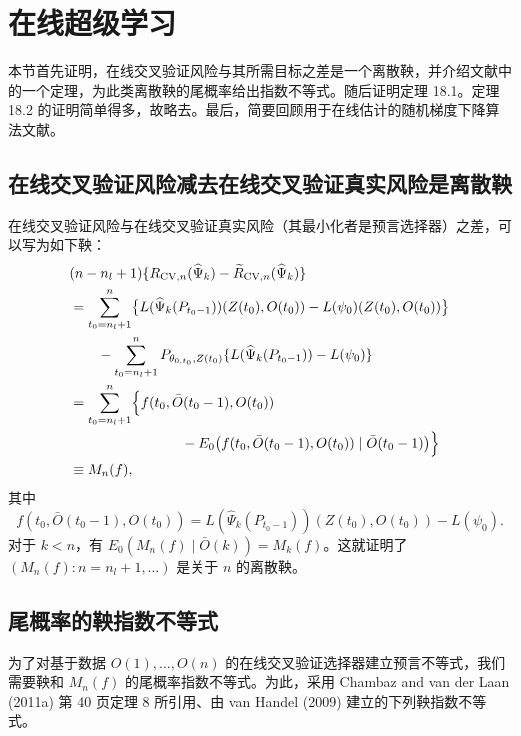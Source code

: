 
\section{在线超级学习}

本节首先证明，在线交叉验证风险与其所需目标之差是一个离散鞅，并介绍文献中的一个定理，为此类离散鞅的尾概率给出指数不等式。随后证明定理 18.1。定理 18.2 的证明简单得多，故略去。最后，简要回顾用于在线估计的随机梯度下降算法文献。

\subsection{在线交叉验证风险减去在线交叉验证真实风险是离散鞅}

在线交叉验证风险与在线交叉验证真实风险（其最小化者是预言选择器）之差，可以写为如下鞅：
\[
\begin{aligned}
&(n-n_l+1)\{R_{\mathrm{CV},n}(\widehat\Psi_k)
 -\widetilde R_{\mathrm{CV},n}(\widehat\Psi_k)\}\\
&=\sum_{t_0=n_l+1}^n\bigl\{
 L(\widehat\Psi_k(P_{t_0-1}))(Z(t_0),O(t_0))
 -L(\psi_0)(Z(t_0),O(t_0))\bigr\}\\
&\qquad-\sum_{t_0=n_l+1}^nP_{\theta_{0,t_0},Z(t_0)}
 \{L(\widehat\Psi_k(P_{t_0-1}))-L(\psi_0)\}\\
&=\sum_{t_0=n_l+1}^n\Bigl\{
 f(t_0,\bar O(t_0-1),O(t_0))\\
&\hspace{8em}-E_0\bigl(f(t_0,\bar O(t_0-1),O(t_0))\mid\bar O(t_0-1)\bigr)\Bigr\}\\
&\equiv M_n(f),
\end{aligned}
\]
其中
\[
f(t_0,\bar O(t_0-1),O(t_0))
 =L(\widehat\Psi_k(P_{t_0-1}))(Z(t_0),O(t_0))-L(\psi_0).
\]
对于 $k<n$，有 $E_0(M_n(f)\mid\bar O(k))=M_k(f)$。这就证明了 $(M_n(f):n=n_l+1,\ldots)$ 是关于 $n$ 的离散鞅。

\subsection{尾概率的鞅指数不等式}

为了对基于数据 $O(1),\ldots,O(n)$ 的在线交叉验证选择器建立预言不等式，我们需要鞅和 $M_n(f)$ 的尾概率指数不等式。为此，采用 Chambaz and van der Laan (2011a) 第 40 页定理 8 所引用、由 van Handel (2009) 建立的下列鞅指数不等式。


